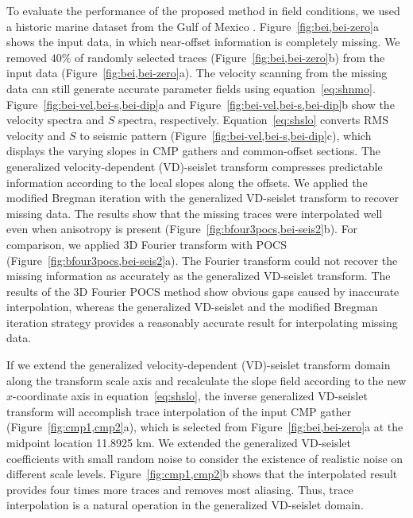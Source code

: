  To evaluate the performance of the proposed method in field
 conditions, we used a historic marine dataset from the Gulf of
 Mexico \cite[]{Claerbout08a}. Figure~\ref{fig:bei,bei-zero}a shows
 the input data, in which near-offset information is completely
 missing. We removed 40\% of randomly selected traces
 (Figure~\ref{fig:bei,bei-zero}b) from the input data
 (Figure~\ref{fig:bei,bei-zero}a). The velocity scanning from the
 missing data can still generate accurate parameter fields using
 equation~\ref{eq:shnmo}. Figure~\ref{fig:bei-vel,bei-s,bei-dip}a and
 Figure~\ref{fig:bei-vel,bei-s,bei-dip}b show the velocity spectra and
 $S$ spectra, respectively. Equation~\ref{eq:shslo} converts RMS
 velocity and $S$ to seismic pattern
 (Figure~\ref{fig:bei-vel,bei-s,bei-dip}c), which displays the varying
 slopes in CMP gathers and common-offset sections. The generalized
 velocity-dependent (VD)-seislet transform compresses predictable
 information according to the local slopes along the offsets. We
 applied the modified Bregman iteration with the generalized
 VD-seislet transform to recover missing data. The results show that
 the missing traces were interpolated well even when anisotropy is
 present (Figure~\ref{fig:bfour3pocs,bei-seis2}b). For comparison, we
 applied 3D Fourier transform with POCS
 (Figure~\ref{fig:bfour3pocs,bei-seis2}a). The Fourier transform could
 not recover the missing information as accurately as the generalized
 VD-seislet transform. The results of the 3D Fourier POCS method show
 obvious gaps caused by inaccurate interpolation, whereas the
 generalized VD-seislet and the modified Bregman iteration strategy
 provides a reasonably accurate result for interpolating missing data.

 If we extend the generalized velocity-dependent (VD)-seislet
 transform domain along the transform scale axis and recalculate the
 slope field according to the new $x$-coordinate axis in
 equation~\ref{eq:shslo}, the inverse generalized VD-seislet transform
 will accomplish trace interpolation of the input CMP gather
 (Figure~\ref{fig:cmp1,cmp2}a), which is selected from
 Figure~\ref{fig:bei,bei-zero}a at the midpoint location 11.8925
 km. We extended the generalized VD-seislet coefficients with small
 random noise to consider the existence of realistic noise on
 different scale levels.  Figure~\ref{fig:cmp1,cmp2}b shows that the
 interpolated result provides four times more traces and removes most
 aliasing. Thus, trace interpolation is a natural operation in the
 generalized VD-seislet domain.

